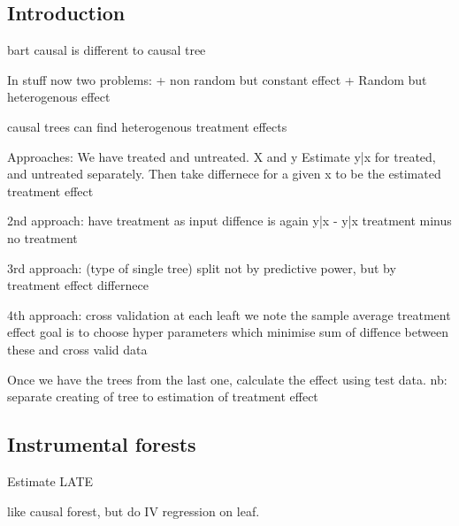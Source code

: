
\subsection{Introduction}

bart causal is different to causal tree

In stuff now two problems:
+ non random but constant effect
+ Random but heterogenous effect

causal trees can find heterogenous treatment effects

Approaches:
We have treated and untreated. X and y
Estimate y|x for treated, and untreated separately.
Then take differnece for a given x to be the estimated treatment effect

2nd approach:
have treatment as input
diffence is again y|x - y|x treatment minus no treatment

3rd approach: (type of single tree)
split not by predictive power, but by treatment effect differnece

4th approach:
cross validation
at each leaft we note the sample average treatment effect
goal is to choose hyper parameters which minimise sum of diffence between these and cross valid data

Once we have the trees from the last one, calculate the effect using test data. nb: separate creating of tree to estimation of treatment effect

\subsection{Instrumental forests}

Estimate LATE

like causal forest, but do IV regression on leaf.

